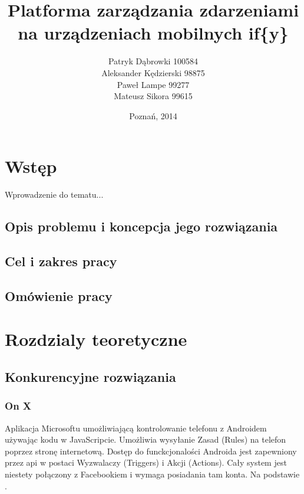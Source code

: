 \documentclass[11pt,a4paper,polish,thesis]{dcsbook}
\begin{document}
\author{Patryk Dąbrowki 100584\\ Aleksander Kędzierski 98875\\ Paweł Lampe 99277\\ Mateusz Sikora 99615}
\title{Platforma zarządzania zdarzeniami na urządzeniach mobilnych if\{y\}}
\date{Poznań, 2014}

\maketitle

\frontmatter

\tableofcontents{}

\mainmatter

\chapter{Wstęp}
Wprowadzenie do tematu...
\section{Opis problemu i koncepcja jego rozwiązania}
\section{Cel i zakres pracy}
\section{Omówienie pracy}

\chapter{Rozdzialy teoretyczne}
\section{Konkurencyjne rozwiązania}
\subsection{On X}
Aplikacja Microsoftu umożliwiającą kontrolowanie telefonu z Androidem używając kodu w JavaScripcie. Umożliwia wysyłanie Zasad (Rules) na telefon poprzez stronę internetową. Dostęp do funckcjonalości Androida jest zapewniony przez api w postaci Wyzwalaczy (Triggers) i Akcji (Actions). Cały system jest niestety połączony z Facebookiem i wymaga posiadania tam konta.
Na podstawie \cite{onx}.
\end{document}
